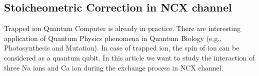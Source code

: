 \subsection{Stoicheometric Correction in NCX channel}

Trapped ion Quantum Computer is already in practice. There are interesting application of Quantum Physics phenomena in Quantum Biology (e.g., Photosynthesis and Mutation). In case of trapped ion, the spin of ion can be considered as a quantum qubit. In this article we want to study the interaction of three Na ions and Ca ion during the exchange process in NCX channel.